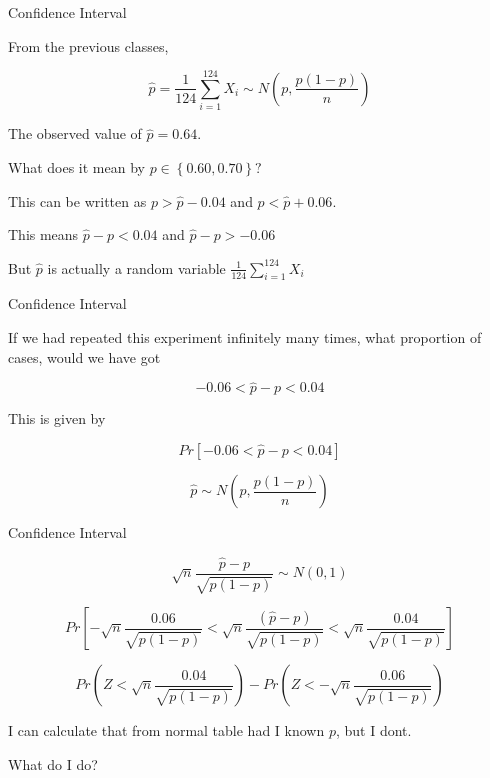 \documentclass{beamer}\usepackage[]{graphicx}\usepackage[]{color}
\begin{document}
\begin{frame}{Confidence Interval}

From the previous classes, 

$$ \hat{p} = \frac{1}{124} \sum_{i=1}^{124} X_{i} \sim N \left ( p, \frac{p(1-p)}{n} \right)  $$

The observed value of $\hat{p} = 0.64$. \pause \newline

What does it mean by $p \in \left \{ 0.60, 0.70 \right \} ? $ \pause \newline

This can be written as $ p > \hat{p} - 0.04$ and $p <\hat{p} + 0.06$. \pause \newline

This means $\hat{p} - p < 0.04$ and $\hat{p} - p > -0.06$  \pause \newline

But $\hat{p}$ is actually a random variable $\frac{1}{124} \sum_{i=1}^{124} X_{i}$

\end{frame}

\begin{frame}{Confidence Interval}

If we had repeated this experiment infinitely many times, what proportion of cases, would we have got  \pause \newline


$$ -0.06 < \hat{p} - p < 0.04 $$ \pause 

This is given by 

$$ Pr \left [ -0.06 < \hat{p} - p < 0.04 \right ] $$ \pause

$$ \hat{p} \sim N \left ( p, \frac{p(1-p)}{n} \right ) $$ \pause 


\end{frame}

\begin{frame}{Confidence Interval}

$$ \sqrt{n} \frac{\hat{p} - p}{\sqrt{p(1-p)}} \sim N(0, 1)  $$ \pause

$$ Pr \left [ -\sqrt{n} \frac{0.06}{\sqrt{p(1-p)}} < \sqrt{n}\frac{(\hat{p} - p)}{\sqrt{p(1-p)}} < \sqrt{n} \frac{0.04}{\sqrt{p(1-p)}} \right ] $$

$$ Pr (Z < \sqrt{n} \frac{0.04}{\sqrt{p(1-p)}}) - Pr (Z < -\sqrt{n} \frac{0.06}{\sqrt{p(1-p)}}) $$

I can calculate that from normal table had I known $p$, but I dont.  \pause \newline

What do I do? \pause \newline

\end{frame}
\end{document}
